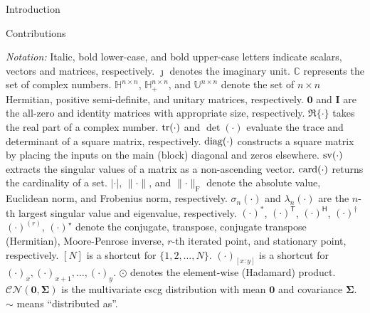 \begin{section}{Introduction}
\begin{subsection}{Contributions}
	\end{subsection}

	\emph{Notation:}
	Italic, bold lower-case, and bold upper-case letters indicate scalars, vectors and matrices, respectively.
	$\jmath$ denotes the imaginary unit.
	$\mathbb{C}$ represents the set of complex numbers.
	$\mathbb{H}^{n \times n}$, $\mathbb{H}_+^{n \times n}$, and $\mathbb{U}^{n \times n}$ denote the set of $n \times n$ Hermitian, positive semi-definite, and unitary matrices, respectively.
	$\mathbf{0}$ and $\mathbf{I}$ are the all-zero and identity matrices with appropriate size, respectively.
	$\Re\{\cdot\}$ takes the real part of a complex number.
	$\operatorname{tr}(\cdot)$ and $\det(\cdot)$ evaluate the trace and determinant of a square matrix, respectively.
	$\operatorname{diag}(\cdot)$ constructs a square matrix by placing the inputs on the main (block) diagonal and zeros elsewhere.
	$\operatorname{sv}(\cdot)$ extracts the singular values of a matrix as a non-ascending vector.
	$\operatorname{card}(\cdot)$ returns the cardinality of a set.
	$\lvert \cdot \rvert$, $\lVert \cdot \rVert$, and $\lVert \cdot \rVert _\mathrm{F}$ denote the absolute value, Euclidean norm, and Frobenius norm, respectively.
	$\sigma_n(\cdot)$ and $\lambda_n(\cdot)$ are the $n$-th largest singular value and eigenvalue, respectively.
	$(\cdot)^*$, $(\cdot)^\mathsf{T}$, $(\cdot)^\mathsf{H}$, $(\cdot)^\dagger$ $(\cdot)^{(r)}$, $(\cdot)^{\star}$ denote the conjugate, transpose, conjugate transpose (Hermitian), Moore-Penrose inverse, $r$-th iterated point, and stationary point, respectively.
	$[N]$ is a shortcut for $\{1,2,\ldots,N\}$.
	$(\cdot)_{[x:y]}$ is a shortcut for $(\cdot)_x,(\cdot)_{x+1},\ldots,(\cdot)_y$.
	$\odot$ denotes the element-wise (Hadamard) product.
	$\mathcal{CN}(\mathbf{0}, \mathbf{\Sigma})$ is the multivariate \gls{cscg} distribution with mean $\mathbf{0}$ and covariance $\mathbf{\Sigma}$.
	$\sim$ means ``distributed as''.
	\end{section}

